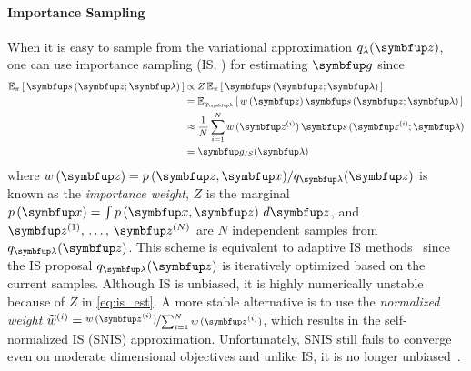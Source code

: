 \paragraph{Importance Sampling}
When it is easy to sample from the variational approximation \(q_{\lambda}(\vz)\), one can use importance sampling (IS, \citealt{robert_monte_2004, mcbook}) for estimating \(\vg\) since 
\vspace{-0.05in}
\begin{align}
  \Esub{\pi}{ \vs\,(\vz; \vlambda) } 
  &\propto Z\,\Esub{\pi}{ \vs\,(\vz; \vlambda) } \label{eq:is_est} \\
  &= \Esub{q_{\vlambda}}{ w\,(\vz) \, \vs\,(\vz; \vlambda) } \\
  &\approx \frac{1}{N} \sum^{N}_{i=1} w\,(\vz^{(i)}) \, \vs\,(\vz^{(i)}; \vlambda) \\
  &= \vg_{IS}(\vlambda)
\end{align}
where \(w\,(\vz) = p\,(\vz,\vx) / q_{\vlambda}(\vz)\) is known as the \textit{importance weight}, \(Z\) is the marginal \(p\left(\vx\right) = \int p\left(\vx, \vz\right) \, d\vz\), and \(\vz^{(1)},\, \ldots,\, \vz^{(N)}\) are \(N\) independent samples from \(q_{\vlambda}(\vz)\).
This scheme is equivalent to adaptive IS methods~\citep{cappe_adaptive_2008, bugallo_adaptive_2017} since the IS proposal \(q_{\vlambda}(\vz)\) is iteratively optimized based on the current samples.
Although IS is unbiased, it is highly numerically unstable because of \(Z\) in \cref{eq:is_est}.
A more stable alternative is to use the \textit{normalized weight} \(\widetilde{w}^{(i)} = \nicefrac{w\,(\vz^{(i)})}{\sum_{i=1}^N w\,(\vz^{(i)}) }\), which results in the self-normalized IS (SNIS) approximation.
Unfortunately, SNIS still fails to converge even on moderate dimensional objectives and unlike IS, it is no longer unbiased~\citep{robert_monte_2004, mcbook}.

